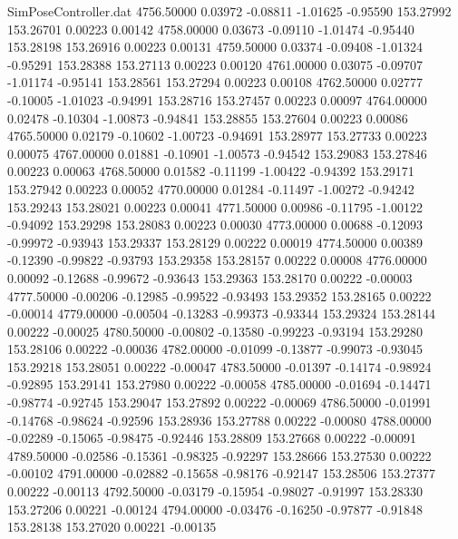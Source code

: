 \begin{filecontents}{SimPoseController.dat}
4756.50000    0.03972   -0.08811    -1.01625   -0.95590  153.27992  153.26701    0.00223    0.00142
4758.00000    0.03673   -0.09110    -1.01474   -0.95440  153.28198  153.26916    0.00223    0.00131
4759.50000    0.03374   -0.09408    -1.01324   -0.95291  153.28388  153.27113    0.00223    0.00120
4761.00000    0.03075   -0.09707    -1.01174   -0.95141  153.28561  153.27294    0.00223    0.00108
4762.50000    0.02777   -0.10005    -1.01023   -0.94991  153.28716  153.27457    0.00223    0.00097
4764.00000    0.02478   -0.10304    -1.00873   -0.94841  153.28855  153.27604    0.00223    0.00086
4765.50000    0.02179   -0.10602    -1.00723   -0.94691  153.28977  153.27733    0.00223    0.00075
4767.00000    0.01881   -0.10901    -1.00573   -0.94542  153.29083  153.27846    0.00223    0.00063
4768.50000    0.01582   -0.11199    -1.00422   -0.94392  153.29171  153.27942    0.00223    0.00052
4770.00000    0.01284   -0.11497    -1.00272   -0.94242  153.29243  153.28021    0.00223    0.00041
4771.50000    0.00986   -0.11795    -1.00122   -0.94092  153.29298  153.28083    0.00223    0.00030
4773.00000    0.00688   -0.12093    -0.99972   -0.93943  153.29337  153.28129    0.00222    0.00019
4774.50000    0.00389   -0.12390    -0.99822   -0.93793  153.29358  153.28157    0.00222    0.00008
4776.00000    0.00092   -0.12688    -0.99672   -0.93643  153.29363  153.28170    0.00222   -0.00003
4777.50000   -0.00206   -0.12985    -0.99522   -0.93493  153.29352  153.28165    0.00222   -0.00014
4779.00000   -0.00504   -0.13283    -0.99373   -0.93344  153.29324  153.28144    0.00222   -0.00025
4780.50000   -0.00802   -0.13580    -0.99223   -0.93194  153.29280  153.28106    0.00222   -0.00036
4782.00000   -0.01099   -0.13877    -0.99073   -0.93045  153.29218  153.28051    0.00222   -0.00047
4783.50000   -0.01397   -0.14174    -0.98924   -0.92895  153.29141  153.27980    0.00222   -0.00058
4785.00000   -0.01694   -0.14471    -0.98774   -0.92745  153.29047  153.27892    0.00222   -0.00069
4786.50000   -0.01991   -0.14768    -0.98624   -0.92596  153.28936  153.27788    0.00222   -0.00080
4788.00000   -0.02289   -0.15065    -0.98475   -0.92446  153.28809  153.27668    0.00222   -0.00091
4789.50000   -0.02586   -0.15361    -0.98325   -0.92297  153.28666  153.27530    0.00222   -0.00102
4791.00000   -0.02882   -0.15658    -0.98176   -0.92147  153.28506  153.27377    0.00222   -0.00113
4792.50000   -0.03179   -0.15954    -0.98027   -0.91997  153.28330  153.27206    0.00221   -0.00124
4794.00000   -0.03476   -0.16250    -0.97877   -0.91848  153.28138  153.27020    0.00221   -0.00135

\end{filecontents}
